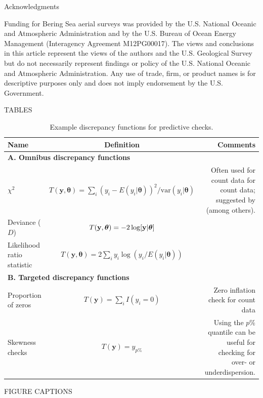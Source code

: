 \documentclass[12pt,english]{article}
\begin{document}
\begin{spacing}{1.9}
\centerline{\sc Acknowledgments} Funding
for Bering Sea aerial surveys was provided by the U.S. National Oceanic and Atmospheric
Administration and by the U.S. Bureau of Ocean Energy Management (Interagency
Agreement M12PG00017).  The views and conclusions in this article represent the views of the authors and the U.S. Geological Survey but do not necessarily represent findings or policy of the U.S. National Oceanic and Atmospheric Administration.  Any use of trade, firm, or product names is for descriptive purposes only and does not imply endorsement by the U.S. Government.

\renewcommand{\refname}{Literature Cited}




\pagebreak

TABLES

\begin{table}[ht]
\caption{Example discrepancy functions for predictive checks.
}
\centering
\begin{tabular}{lcr}
  \hline
  Name & Definition & Comments \\
  \hline
  \multicolumn{3}{l}{\textbf{A. Omnibus discrepancy functions}} \\
  $\chi^2$ & $T(\textbf{y},\boldsymbol{\theta}) = \sum_i (y_i - E(y_i|\boldsymbol{\theta}))^2/\textrm{var}(y_i|\boldsymbol{\theta})$ & Often used for count data for count data; suggested by \citet{GelmanEtAl2004} (among others).\\
  Deviance ($D$) &  $T(\textbf{y},\boldsymbol{\theta}) = -2 \log [{\bf y} | \boldsymbol{\theta}]$ & \citep{KingEtAl}\\
  Likelihood ratio statistic & $T(\textbf{y},\boldsymbol{\theta}) = 2 \sum_i y_i \log(y_i/E(y_i|\boldsymbol{\theta}))$ & \citep{LunnEtAl2013} \\
  \multicolumn{3}{l}{\textbf{B. Targeted discrepancy functions}} \\
  Proportion of zeros & $T(\textbf{y}) = \sum_i I(y_i = 0) $ & Zero inflation check for count data \\
  Skewness checks & $T(\textbf{y}) = y_{p\%} $ & Using the $p\%$ quantile can be useful for checking for over- or underdispersion. \\
\hline
\end{tabular}
\end{table}

\pagebreak

FIGURE CAPTIONS


\end{spacing}
\end{document}
